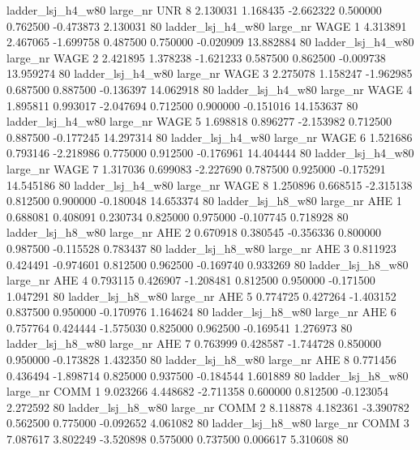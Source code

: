   ladder_lsj_h4_w80   large_nr      UNR                 8  2.130031  1.168435  -2.662322 0.500000 0.762500 -0.473873    2.130031 80
  ladder_lsj_h4_w80   large_nr     WAGE                 1  4.313891  2.467065  -1.699758 0.487500 0.750000 -0.020909   13.882884 80
  ladder_lsj_h4_w80   large_nr     WAGE                 2  2.421895  1.378238  -1.621233 0.587500 0.862500 -0.009738   13.959274 80
  ladder_lsj_h4_w80   large_nr     WAGE                 3  2.275078  1.158247  -1.962985 0.687500 0.887500 -0.136397   14.062918 80
  ladder_lsj_h4_w80   large_nr     WAGE                 4  1.895811  0.993017  -2.047694 0.712500 0.900000 -0.151016   14.153637 80
  ladder_lsj_h4_w80   large_nr     WAGE                 5  1.698818  0.896277  -2.153982 0.712500 0.887500 -0.177245   14.297314 80
  ladder_lsj_h4_w80   large_nr     WAGE                 6  1.521686  0.793146  -2.218986 0.775000 0.912500 -0.176961   14.404444 80
  ladder_lsj_h4_w80   large_nr     WAGE                 7  1.317036  0.699083  -2.227690 0.787500 0.925000 -0.175291   14.545186 80
  ladder_lsj_h4_w80   large_nr     WAGE                 8  1.250896  0.668515  -2.315138 0.812500 0.900000 -0.180048   14.653374 80
  ladder_lsj_h8_w80   large_nr      AHE                 1  0.688081  0.408091   0.230734 0.825000 0.975000 -0.107745    0.718928 80
  ladder_lsj_h8_w80   large_nr      AHE                 2  0.670918  0.380545  -0.356336 0.800000 0.987500 -0.115528    0.783437 80
  ladder_lsj_h8_w80   large_nr      AHE                 3  0.811923  0.424491  -0.974601 0.812500 0.962500 -0.169740    0.933269 80
  ladder_lsj_h8_w80   large_nr      AHE                 4  0.793115  0.426907  -1.208481 0.812500 0.950000 -0.171500    1.047291 80
  ladder_lsj_h8_w80   large_nr      AHE                 5  0.774725  0.427264  -1.403152 0.837500 0.950000 -0.170976    1.164624 80
  ladder_lsj_h8_w80   large_nr      AHE                 6  0.757764  0.424444  -1.575030 0.825000 0.962500 -0.169541    1.276973 80
  ladder_lsj_h8_w80   large_nr      AHE                 7  0.763999  0.428587  -1.744728 0.850000 0.950000 -0.173828    1.432350 80
  ladder_lsj_h8_w80   large_nr      AHE                 8  0.771456  0.436494  -1.898714 0.825000 0.937500 -0.184544    1.601889 80
  ladder_lsj_h8_w80   large_nr     COMM                 1  9.023266  4.448682  -2.711358 0.600000 0.812500 -0.123054    2.272592 80
  ladder_lsj_h8_w80   large_nr     COMM                 2  8.118878  4.182361  -3.390782 0.562500 0.775000 -0.092652    4.061082 80
  ladder_lsj_h8_w80   large_nr     COMM                 3  7.087617  3.802249  -3.520898 0.575000 0.737500  0.006617    5.310608 80
